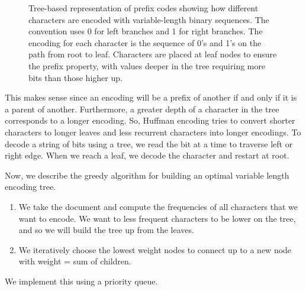 \begin{figure}[H]
    \caption{Tree-based representation of prefix codes showing how different characters are encoded with variable-length binary sequences. The convention uses 0 for left branches and 1 for right branches. The encoding for each character is the sequence of 0's and 1's on the path from root to leaf. Characters are placed at leaf nodes to ensure the prefix property, with values deeper in the tree requiring more bits than those higher up.}
    \label{fig:prefix-tree}
  \end{figure}

  This makes sense since an encoding will be a prefix of another if and only if it is a parent of another. Furthermore, a greater depth of a character in the tree corresponds to a longer encoding. So, Huffman encoding tries to convert shorter characters to longer leaves and less recurrent characters into longer encodings. To decode a string of bits using a tree, we read the bit at a time to traverse left or right edge. When we reach a leaf, we decode the character and restart at root. 

  Now, we describe the greedy algorithm for building an optimal variable length encoding tree. 
  \begin{enumerate}
      \item We take the document and compute the frequencies of all characters that we want to encode. We want to less frequent characters to be lower on the tree, and so we will build the tree up from the leaves. 
      \item We iteratively choose the lowest weight nodes to connect up to a new node with weight = sum of children. 
  \end{enumerate}
  We implement this using a priority queue. 

